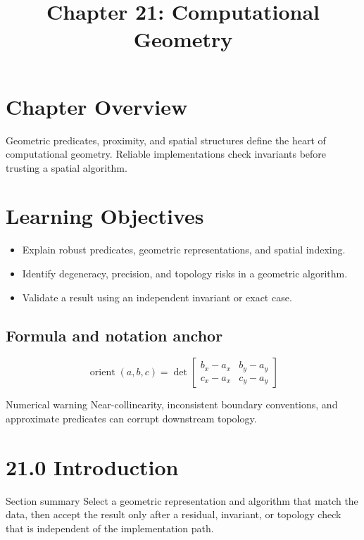 \documentclass[10pt,letterpaper]{article}
\title{Chapter 21: Computational Geometry}
\author{}
\date{}
\begin{document}
\maketitle

\section*{Chapter Overview}
Geometric predicates, proximity, and spatial structures define the heart of computational geometry. Reliable implementations check invariants before trusting a spatial algorithm.

\section*{Learning Objectives}
\begin{itemize}
\item Explain robust predicates, geometric representations, and spatial indexing.
\item Identify degeneracy, precision, and topology risks in a geometric algorithm.
\item Validate a result using an independent invariant or exact case.
\end{itemize}

\subsection*{Formula and notation anchor}
\[
\operatorname{orient}(a,b,c)=\det\!\begin{bmatrix}b_x-a_x&b_y-a_y\\c_x-a_x&c_y-a_y\end{bmatrix}
\]

\begin{exambox}{Numerical warning}
Near-collinearity, inconsistent boundary conventions, and approximate predicates can corrupt downstream topology.
\end{exambox}

\section{21.0 Introduction}
\begin{cornell}
\end{cornell}

\begin{summarybox}{Section summary}
Select a geometric representation and algorithm that match the data, then accept the result only after a residual, invariant, or topology check that is independent of the implementation path.
\end{summarybox}
\end{document}
